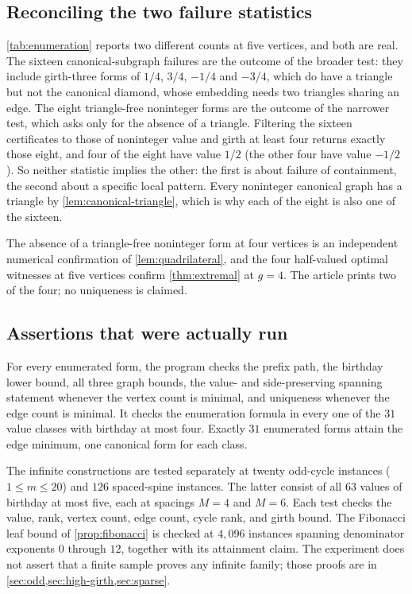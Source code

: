 \documentclass[11pt,a4paper]{article}
\numberwithin{equation}{section}
\theoremstyle{definition}
\theoremstyle{remark}
\begin{document}
\subsection{Reconciling the two failure statistics}

\cref{tab:enumeration} reports two different counts at five vertices, and both
are real. The sixteen canonical-subgraph failures are the outcome of the broader
test: they include girth-three forms of $1/4$, $3/4$, $-1/4$ and $-3/4$, which do
have a triangle but not the canonical diamond, whose embedding needs two
triangles sharing an edge. The eight triangle-free noninteger forms are the
outcome of the narrower test, which asks only for the absence of a triangle.
Filtering the sixteen certificates to those of noninteger value and girth at
least four returns exactly those eight, and four of the eight have value $1/2$
(the other four have value $-1/2$). So neither statistic implies the other:
the first is about failure of containment, the second about a specific local
pattern. Every noninteger canonical graph has a triangle by
\cref{lem:canonical-triangle}, which is why each of the eight is also one of the
sixteen.

The absence of a triangle-free noninteger form at four vertices is an
independent numerical confirmation of \cref{lem:quadrilateral}, and the four
half-valued optimal witnesses at five vertices confirm \cref{thm:extremal} at
$g=4$. The article prints two of the four; no uniqueness is claimed.

\subsection{Assertions that were actually run}

For every enumerated form, the program checks the prefix path, the birthday
lower bound, all three graph bounds, the value- and side-preserving spanning
statement whenever the vertex count is minimal, and uniqueness whenever the
edge count is minimal. It checks the enumeration formula in every one of the
$31$ value classes with birthday at most four. Exactly $31$ enumerated forms
attain the edge minimum, one canonical form for each class.

The infinite constructions are tested separately at twenty odd-cycle instances
($1\leq m\leq20$) and $126$ spaced-spine instances. The latter consist of all
$63$ values of birthday at most five, each at spacings $M=4$ and $M=6$. Each test
checks the value, rank, vertex count, edge count, cycle rank, and girth bound.
The Fibonacci leaf bound of \cref{prop:fibonacci} is checked at $4{,}096$
instances spanning denominator exponents $0$ through $12$, together with its
attainment claim. The experiment does not assert that a finite sample proves any
infinite family; those proofs are in
\cref{sec:odd,sec:high-girth,sec:sparse}.
\end{document}

